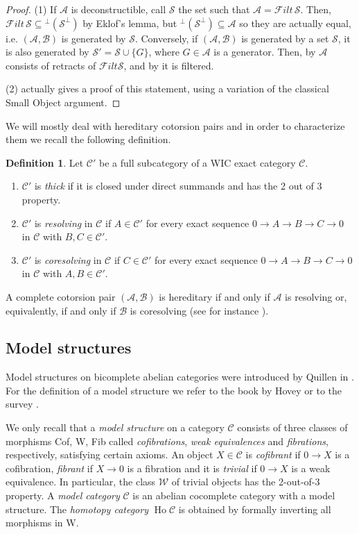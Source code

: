 \documentclass[11pt,a4paper,reqno]{amsart}
\renewcommand{\iff}{if and only if }
\newcommand{\A}{\mathcal{A}}
\newcommand{\B}{\mathcal{B}}
\newcommand{\C}{\mathcal{C}}
\newcommand{\F}{\mathcal{F}}
\newcommand{\clS}{\mathcal{S}}
\newcommand{\W}{\mathcal{W}}
\newcommand{\Ho}{\operatorname{Ho}}
\theoremstyle{plain}
\theoremstyle{definition}
\newtheorem{defn}[thm]{Definition}
\theoremstyle{remark}
\begin{document}
\begin{proof}
  (1) If $\A$ is deconstructible, call $\clS$ the set such that $\A = \F ilt\,\clS$. Then, $\F ilt\,\clS \subseteq {^\perp(\clS^\perp)}$ by Eklof's lemma, but ${^\perp(\clS^\perp)}\subseteq\A$ so they are actually equal, i.e. $(\A,\B)$ is generated by $\clS$.
  Conversely, if $(\A,\B)$ is generated by a set $\clS$, it is also generated by $\clS'=\clS\cup\{G\}$, where $G\in\A$ is a generator. Then, by \cite[Theorem~5.16]{Sto13} $\A$ consists of retracts of $\F ilt \clS$, and by \cite[Proposition~2.9(1)]{St10-deconstr} it is filtered.

  (2) \cite[Theorem~5.16]{Sto13} actually gives a proof of this statement, using a variation of the classical Small Object argument.
\end{proof}

%


We will mostly deal with  hereditary cotorsion pairs and
in order to characterize them we recall the following definition.
\begin{defn}\label{D:thick} Let $\C'$ be  a full subcategory of a WIC exact category $\C$.
\begin{enumerate}
\item $\C'$ is \emph{thick} if it is closed under direct summands and has the 2 out of 3 property.
\item $\C'$ is \emph{resolving} in $\C$ if $A\in \C'$ for every exact sequence $0\to A\to B\to C\to 0$ in $\C$ with $B, C\in \C'$.
\item $\C'$ is \emph{coresolving} in $\C$ if $C\in \C'$ for every exact sequence $0\to A\to B\to C\to 0$ in $\C$ with $A, B\in \C'$.
\end{enumerate}
\end{defn}

A complete cotorsion pair $(\A, \B)$ is hereditary \iff $\A$ is resolving or, equivalently, \iff $\B$ is coresolving  (see for instance \cite[Lemma 6.17]{Sto13}).

%
%
%

\subsection{Model structures}\label{S:model}
Model structures on bicomplete abelian categories were introduced by Quillen in \cite{QHtp}.
For the definition of a model structure we refer to the book by Hovey \cite{Hov99} or to the survey \cite{Sto13}.

We only recall that a \emph{model structure} on a category $\C$ consists
of three classes of morphisms Cof, W, Fib called \emph{cofibrations}, \emph{weak equivalences} and \emph{fibrations}, respectively, satisfying certain axioms. An object $X\in \C$ is \emph{cofibrant} if $0\to X$ is a cofibration,  \emph{fibrant} if $X\to 0$ is a fibration and it is \emph{trivial} if $0\to X$ is a weak equivalence.
In particular, the class $\W$ of trivial objects has the 2-out-of-3 property.
A \emph{model category} $\C$ is an abelian cocomplete category with a model structure.
 The \emph{homotopy category} $\Ho \C$ is obtained by  formally inverting all morphisms in W.
\end{document}
